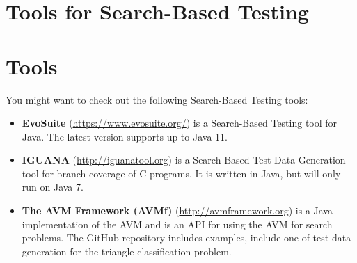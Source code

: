 \section{Tools for Search-Based Testing}

\section{Tools}

You might want to check out the following Search-Based Testing tools:

\begin{itemize}

    \item {\bf EvoSuite} (\url{https://www.evosuite.org/}) is a Search-Based
    Testing tool for Java. The latest version supports up to Java 11.

    \item {\bf IGUANA} (\url{http://iguanatool.org}) is a Search-Based Test Data
    Generation tool for branch coverage of C programs. It is written in Java,
    but will only run on Java 7.

    \item {\bf The AVM Framework (AVMf)} (\url{http://avmframework.org}) is a
    Java implementation of the AVM and is an API for using the AVM for search
    problems. The GitHub repository includes examples, include one of test data
    generation for the triangle classification problem.

\end{itemize}

